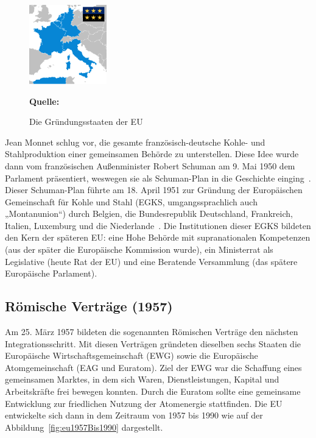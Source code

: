 \noindent
\begin{figure}
  \begin{center}
    \includegraphics[width=0.3\textwidth]{images/EU_1951.png}
  \end{center}
  \caption{Die Gründungsstaaten der EU}
      \textbf{Quelle: }  \cite{montanunion1951}
  \label{fig:EU1951}
\end{figure}
\noindent
Jean Monnet schlug vor, die gesamte französisch-deutsche Kohle- und Stahlproduktion einer gemeinsamen Behörde zu unterstellen. Diese Idee wurde dann vom französischen Außenminister Robert Schuman am 9. Mai 1950 dem Parlament präsentiert, weswegen sie als Schuman-Plan in die Geschichte einging~\cite{gehlerMichaelEU}. Dieser Schuman-Plan führte am 18. April 1951 zur Gründung der Europäischen Gemeinschaft für Kohle und Stahl (EGKS, umgangssprachlich auch „Montanunion“) durch Belgien, die Bundesrepublik Deutschland, Frankreich, Italien, Luxemburg und die Niederlande~\cite{euroArchive1951}. Die Institutionen dieser EGKS bildeten den Kern der späteren EU: eine Hohe Behörde mit supranationalen Kompetenzen (aus der später die Europäische Kommission wurde), ein Ministerrat als Legislative (heute Rat der EU) und eine Beratende Versammlung (das spätere Europäische Parlament). 

\subsection{Römische Verträge (1957)}\label{subsec:roemischeVertraege}

Am 25. März 1957 bildeten die sogenannten Römischen Verträge den nächsten Integrationsschritt. Mit diesen Verträgen gründeten dieselben sechs Staaten die Europäische Wirtschaftsgemeinschaft (EWG) sowie die Europäische Atomgemeinschaft (EAG und Euratom)\cite{euroKommision1957}. Ziel der EWG war die Schaffung eines gemeinsamen Marktes, in dem sich Waren, Dienstleistungen, Kapital und Arbeitskräfte frei bewegen konnten. Durch die Euratom sollte eine gemeinsame Entwicklung zur friedlichen Nutzung der Atomenergie stattfinden. \newline
Die EU entwickelte sich dann in dem Zeitraum von 1957 bis 1990 wie auf der Abbildung~\ref{fig:eu1957Bis1990} dargestellt. 

